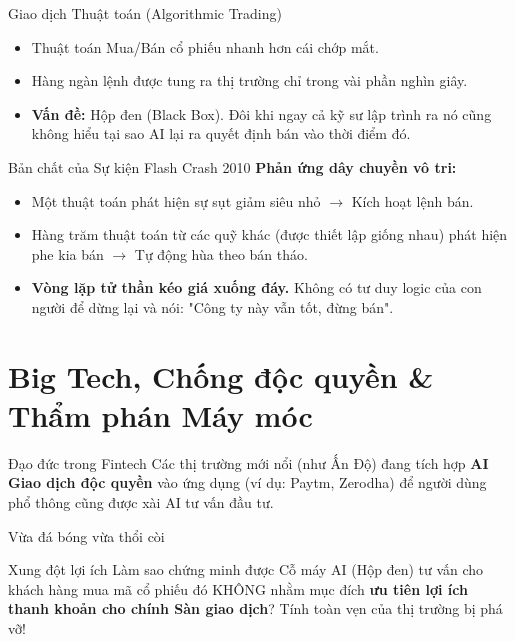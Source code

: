 \documentclass[aspectratio=169]{beamer}
\begin{document}
\begin{frame}{Giao dịch Thuật toán (Algorithmic Trading)}
    \begin{itemize}
        \item Thuật toán Mua/Bán cổ phiếu nhanh hơn cái chớp mắt.
        \item Hàng ngàn lệnh được tung ra thị trường chỉ trong vài phần nghìn giây.
        \item \textbf{Vấn đề:} Hộp đen (Black Box). Đôi khi ngay cả kỹ sư lập trình ra nó cũng không hiểu tại sao AI lại ra quyết định bán vào thời điểm đó.
    \end{itemize}
\end{frame}

\begin{frame}{Bản chất của Sự kiện Flash Crash 2010}
    \textbf{Phản ứng dây chuyền vô tri:}
    \begin{itemize}
        \item Một thuật toán phát hiện sự sụt giảm siêu nhỏ $\rightarrow$ Kích hoạt lệnh bán.
        \item Hàng trăm thuật toán từ các quỹ khác (được thiết lập giống nhau) phát hiện phe kia bán $\rightarrow$ Tự động hùa theo bán tháo.
        \item \textbf{Vòng lặp tử thần kéo giá xuống đáy.} Không có tư duy logic của con người để dừng lại và nói: "Công ty này vẫn tốt, đừng bán".
    \end{itemize}
\end{frame}

\section{Big Tech, Chống độc quyền \& Thẩm phán Máy móc}

\begin{frame}{Đạo đức trong Fintech}
    Các thị trường mới nổi (như Ấn Độ) đang tích hợp \textbf{AI Giao dịch độc quyền} vào ứng dụng (ví dụ: Paytm, Zerodha) để người dùng phổ thông cũng được xài AI tư vấn đầu tư.
\end{frame}

\begin{frame}{Vừa đá bóng vừa thổi còi}
    \begin{alertblock}{Xung đột lợi ích}
        Làm sao chứng minh được Cỗ máy AI (Hộp đen) tư vấn cho khách hàng mua mã cổ phiếu đó KHÔNG nhằm mục đích \textbf{ưu tiên lợi ích thanh khoản cho chính Sàn giao dịch}? Tính toàn vẹn của thị trường bị phá vỡ!
    \end{alertblock}
\end{frame}
\end{document}

